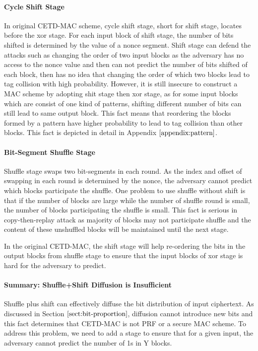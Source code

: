 \paragraph{Cycle Shift Stage}
In original CETD-MAC scheme, cycle shift stage, short for shift stage, locates before the xor stage. For each input block of shift stage, the number of bits shifted is determined by the value of a nonce segment. Shift stage can defend the attacks such as changing the order of two input blocks as the adversary has no access to the nonce value and then can not predict the number of bits shifted of each block, then has no idea that changing the order of which two blocks lead to tag collision with high probability. However, it is still insecure to construct a MAC scheme by adopting shit stage then xor stage, as for some input blocks which are consist of one kind of patterns, shifting different number of bits can still lead to same output block. This fact means that reordering the blocks formed by a pattern have higher probability to lead to tag collision than other blocks. This fact is depicted in detail in Appendix $\ref{appendix:pattern}$. 

\paragraph{Bit-Segment Shuffle Stage}
Shuffle stage swaps two bit-segments in each round. As the index and offset of swapping in each round is determined by the nonce, the adversary cannot predict which blocks participate the shuffle. One problem to use shuffle without shift is that if the number of blocks are large while the number of shuffle round is small, the number of blocks participating the shuffle is small. This fact is serious in copy-then-replay attack as majority of blocks may not participate shuffle and the content of these unshuffled blocks will be maintained until the next stage. %

 In the original CETD-MAC, the shift stage will help re-ordering the bits in the output blocks from shuffle stage to ensure that the input blocks of xor stage is hard for the adversary to predict. 

 \paragraph{Summary: Shuffle+Shift Diffusion is Insufficient}
 Shuffle plus shift can effectively diffuse the bit distribution of input ciphertext. As discussed in Section $\ref{sect:bit-proportion}$, diffusion cannot introduce new bits and this fact determines that CETD-MAC is not PRF or a secure MAC scheme. To address this problem, we need to add a stage to ensure that for a given input, the adversary cannot predict the number of 1s in Y blocks.

